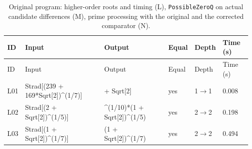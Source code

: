 \begin{longtable}{@{}p{}>{\ttfamily\footnotesize\raggedright\arraybackslash}p{}>{\ttfamily\footnotesize\raggedright\arraybackslash}p{}p{}p{}p{}@{}}
\caption{Original program: higher-order roots and timing (L), \texttt{PossibleZeroQ} on actual candidate differences (M), prime processing with the original and the corrected comparator (N).}\label{tab:r2LMN}\\
\toprule ID & Input & Output & Equal & Depth & Time (s)\\\midrule\endfirsthead
\toprule ID & Input & Output & Equal & Depth & Time (s)\\\midrule\endhead
\bottomrule\endfoot
L01 & Strad[\allowbreak{}(\allowbreak{}239 +\allowbreak{} 169*\allowbreak{}Sqrt[\allowbreak{}2]\allowbreak{})\allowbreak{}\textasciicircum{}\allowbreak{}(\allowbreak{}1/\allowbreak{}7)\allowbreak{}]\allowbreak{} & 1 +\allowbreak{} Sqrt[\allowbreak{}2]\allowbreak{} & yes & 1$\to$1 & 0.008\\
L02 & Strad[\allowbreak{}(\allowbreak{}2 +\allowbreak{} Sqrt[\allowbreak{}2]\allowbreak{})\allowbreak{}\textasciicircum{}\allowbreak{}(\allowbreak{}1/\allowbreak{}5)\allowbreak{}]\allowbreak{} & 2\textasciicircum{}\allowbreak{}(\allowbreak{}1/\allowbreak{}10)\allowbreak{}*\allowbreak{}(\allowbreak{}1 +\allowbreak{} Sqrt[\allowbreak{}2]\allowbreak{})\allowbreak{}\textasciicircum{}\allowbreak{}(\allowbreak{}1/\allowbreak{}5)\allowbreak{} & yes & 2$\to$2 & 0.198\\
L03 & Strad[\allowbreak{}(\allowbreak{}1 +\allowbreak{} Sqrt[\allowbreak{}2]\allowbreak{})\allowbreak{}\textasciicircum{}\allowbreak{}(\allowbreak{}1/\allowbreak{}7)\allowbreak{}]\allowbreak{} & (\allowbreak{}1 +\allowbreak{} Sqrt[\allowbreak{}2]\allowbreak{})\allowbreak{}\textasciicircum{}\allowbreak{}(\allowbreak{}1/\allowbreak{}7)\allowbreak{} & yes & 2$\to$2 & 0.494\\

\end{longtable}
